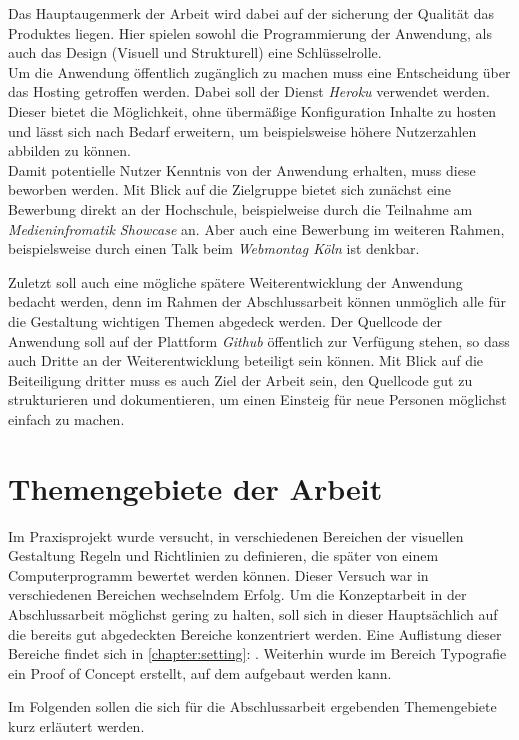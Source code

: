 Das Hauptaugenmerk der Arbeit wird dabei auf der sicherung der Qualität das Produktes liegen. Hier spielen sowohl die Programmierung der Anwendung, als auch das Design (Visuell und Strukturell) eine Schlüsselrolle. \\
Um die Anwendung öffentlich zugänglich zu machen muss eine Entscheidung über das Hosting getroffen werden. Dabei soll der Dienst \textit{Heroku} verwendet werden. Dieser bietet die Möglichkeit, ohne übermäßige Konfiguration Inhalte zu hosten und lässt sich nach Bedarf erweitern, um beispielsweise höhere Nutzerzahlen abbilden zu können. \\
Damit potentielle Nutzer Kenntnis von der Anwendung erhalten, muss diese beworben werden. Mit Blick auf die Zielgruppe bietet sich zunächst eine Bewerbung direkt an der Hochschule, beispielweise durch die Teilnahme am \textit{Medieninfromatik Showcase} an. Aber auch eine Bewerbung im weiteren Rahmen, beispielsweise durch einen Talk beim \textit{Webmontag Köln} ist denkbar.

Zuletzt soll auch eine mögliche spätere Weiterentwicklung der Anwendung bedacht werden, denn im Rahmen der Abschlussarbeit können unmöglich alle für die Gestaltung wichtigen Themen abgedeck werden. Der Quellcode der Anwendung soll auf der Plattform \textit{Github} öffentlich zur Verfügung stehen, so dass auch Dritte an der Weiterentwicklung beteiligt sein können. Mit Blick auf die Beiteiligung dritter muss es auch Ziel der Arbeit sein, den Quellcode gut zu strukturieren und dokumentieren, um einen Einsteig für neue Personen möglichst einfach zu machen.

\section{Themengebiete der Arbeit}
Im Praxisprojekt wurde versucht, in verschiedenen Bereichen der visuellen Gestaltung Regeln und Richtlinien zu definieren, die später von einem Computerprogramm bewertet werden können. Dieser Versuch war in verschiedenen Bereichen wechselndem Erfolg. Um die Konzeptarbeit in der Abschlussarbeit möglichst gering zu halten, soll sich in dieser Hauptsächlich auf die bereits gut abgedeckten Bereiche konzentriert werden. Eine Auflistung dieser Bereiche findet sich in \autoref{chapter:setting}: \textit{}.
Weiterhin wurde im Bereich Typografie ein Proof of Concept erstellt, auf dem aufgebaut werden kann.

Im Folgenden sollen die sich für die Abschlussarbeit ergebenden Themengebiete kurz erläutert werden.

